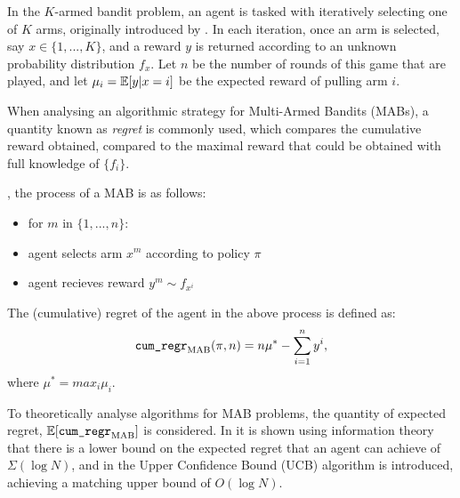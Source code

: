 


    In the $K$-armed bandit problem, an agent is tasked with iteratively selecting one of $K$ arms, originally introduced by  . In each iteration, once an arm is selected, say $x\in\{1,...,K\}$, and a reward $y$ is returned according to an unknown probability distribution $f_x$. Let $n$ be the number of rounds of this game that are played, and let $\mu_i=\mathbb{E}[y|x=i]$ be the expected reward of pulling arm $i$. 
    
    When analysing an algorithmic strategy for Multi-Armed Bandits (MABs), a quantity known as \textit{regret} is commonly used, which compares the cumulative reward obtained, compared to the maximal reward that could be obtained with full knowledge of $\{f_i\}$.


    , the process of a MAB is as follows:
    \begin{itemize}
        \item for $m$ in $\{1,...,n\}$:
        \item agent selects arm $x^m$ according to policy $\pi$
        \item agent recieves reward $y^m \sim f_{x^i}$
    \end{itemize}

    \begin{defn}
        The \textnormal{(cumulative) regret} of the agent in the above process is defined as:
        \begin{align}
            {\textnormal{\texttt{cum\_regr}}}_{{\textnormal{MAB}}}(\pi,n) = n\mu^* - \sum_{i=1}^n y^i,
        \end{align}
        where $\mu^* = max_i \mu_i$.
    \end{defn}

    To theoretically analyse algorithms for MAB problems, the quantity of expected regret, $\mathbb{E}[{\textnormal{\texttt{cum\_regr}}}_{{\textnormal{MAB}}}]$ is considered. In  it is shown using information theory that there is a lower bound on the expected regret that an agent can achieve of $\Sigma(\log N)$, and in  the Upper Confidence Bound (UCB) algorithm is introduced, achieving a matching upper bound of $O(\log N)$. 

